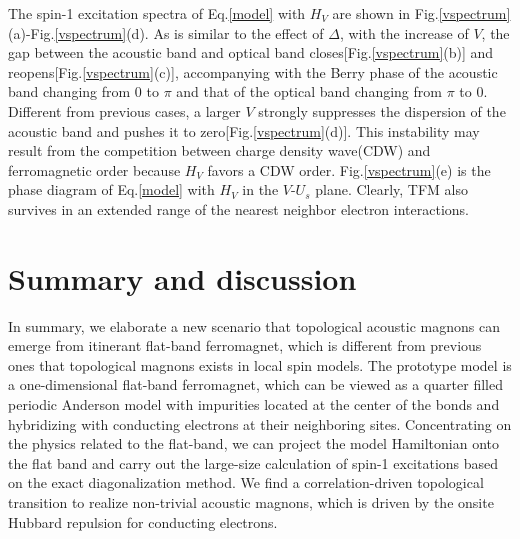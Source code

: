 \documentclass[amsmath,superscriptaddress,showpacs,aps,prb,twocolumn]{revtex4-1}
\begin{document}
\par The spin-1 excitation spectra of Eq.\ref{model} with $H_V$ are shown in Fig.\ref{vspectrum}(a)-Fig.\ref{vspectrum}(d). As is similar to the effect of $\Delta$, with the increase of $V$, the gap between the acoustic band and optical band closes[Fig.\ref{vspectrum}(b)] and reopens[Fig.\ref{vspectrum}(c)], accompanying with the Berry phase of the acoustic band changing from $0$ to $\pi$ and that of the optical band changing from $\pi$ to $0$. Different from previous cases, a larger $V$ strongly suppresses the dispersion of the acoustic band and pushes it to zero[Fig.\ref{vspectrum}(d)]. This instability may result from the competition between charge density wave(CDW) and ferromagnetic order because $H_V$ favors a CDW order. Fig.\ref{vspectrum}(e) is the phase diagram of Eq.\ref{model} with $H_V$ in the $V$-$U_s$ plane. Clearly, TFM also survives in an extended range of the nearest neighbor electron interactions.

\section{Summary and discussion}\label{sd}
\par In summary, we elaborate a new scenario that topological acoustic magnons can emerge from itinerant flat-band ferromagnet, which is different from previous ones that topological magnons exists in local spin models. The prototype model is a one-dimensional flat-band ferromagnet, which can be viewed as a quarter filled periodic Anderson model with impurities located at the center of the bonds and hybridizing with conducting electrons at their neighboring sites. Concentrating on the physics related to the flat-band, we can project the model Hamiltonian onto the flat band and carry out the large-size calculation of spin-1 excitations based on the exact diagonalization method. We find a correlation-driven topological transition to realize non-trivial acoustic magnons, which is driven by the onsite Hubbard repulsion for conducting electrons.
\end{document}
